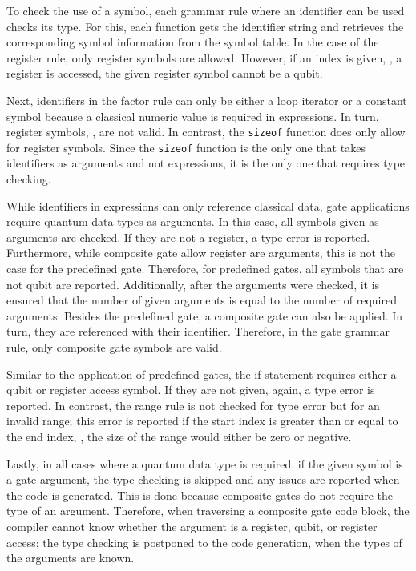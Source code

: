 To check the use of a symbol, each grammar rule where an identifier can be used checks its type. For this, each function gets the identifier string and retrieves the corresponding symbol information from the symbol table. In the case of the register rule, only register symbols are allowed. However, if an index is given, \ie, a register is accessed, the given register symbol cannot be a qubit.

Next, identifiers in the factor rule can only be either a loop iterator or a constant symbol because a classical numeric value is required in expressions. In turn, register symbols, \eg, are not valid. In contrast, the \texttt{sizeof} function does only allow for register symbols. Since the \texttt{sizeof} function is the only one that takes identifiers as arguments and not expressions, it is the only one that requires type checking.

While identifiers in expressions can only reference classical data, gate applications require quantum data types as arguments. In this case, all symbols given as arguments are checked. If they are not a register, a type error is reported. Furthermore, while composite gate allow register are arguments, this is not the case for the predefined gate. Therefore, for predefined gates, all symbols that are not qubit are reported. Additionally, after the arguments were checked, it is ensured that the number of given arguments is equal to the number of required arguments. Besides the predefined gate, a composite gate can also be applied. In turn, they are referenced with their identifier. Therefore, in the gate grammar rule, only composite gate symbols are valid.

Similar to the application of predefined gates, the if-statement requires either a qubit or register access symbol. If they are not given, again, a type error is reported. In contrast, the range rule is not checked for type error but for an invalid range; this error is reported if the start index is greater than or equal to the end index, \ie, the size of the range would either be zero or negative.

Lastly, in all cases where a quantum data type is required, if the given symbol is a gate argument, the type checking is skipped and any issues are reported when the code is generated. This is done because composite gates do not require the type of an argument. Therefore, when traversing a composite gate code block, the compiler cannot know whether the argument is a register, qubit, or register access; the type checking is postponed to the code generation, when the types of the arguments are known.